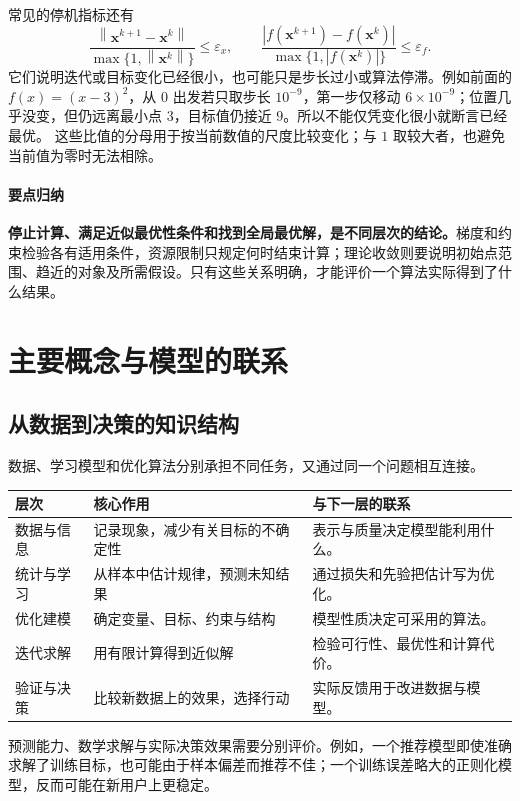 \documentclass[UTF8,fontset=fandol,a4paper,12pt]{ctexart}
\newcommand{\vx}{\boldsymbol x}
\newcommand{\norm}[1]{\left\lVert#1\right\rVert}
\theoremstyle{definition}
\begin{document}
常见的停机指标还有
\[
 \frac{\norm{\vx^{k+1}-\vx^k}}{\max\{1,\norm{\vx^k}\}}\le\varepsilon_x,
 \qquad
 \frac{|f(\vx^{k+1})-f(\vx^k)|}{\max\{1,|f(\vx^k)|\}}\le\varepsilon_f.
\]
它们说明迭代或目标变化已经很小，也可能只是步长过小或算法停滞。例如前面的 $f(x)=(x-3)^2$，从 $0$ 出发若只取步长 $10^{-9}$，第一步仅移动 $6\times10^{-9}$；位置几乎没变，但仍远离最小点 $3$，目标值仍接近 $9$。所以不能仅凭变化很小就断言已经最优。
这些比值的分母用于按当前数值的尺度比较变化；与 $1$ 取较大者，也避免当前值为零时无法相除。

\paragraph{要点归纳}
\textbf{停止计算、满足近似最优性条件和找到全局最优解，是不同层次的结论。}梯度和约束检验各有适用条件，资源限制只规定何时结束计算；理论收敛则要说明初始点范围、趋近的对象及所需假设。只有这些关系明确，才能评价一个算法实际得到了什么结果。

\section{主要概念与模型的联系}
\subsection{从数据到决策的知识结构}
数据、学习模型和优化算法分别承担不同任务，又通过同一个问题相互连接。
\begin{center}
\begin{tabular}{p{}p{}p{}}
\toprule
层次 & 核心作用 & 与下一层的联系\\
\midrule
数据与信息 & 记录现象，减少有关目标的不确定性 & 表示与质量决定模型能利用什么。\\
统计与学习 & 从样本中估计规律，预测未知结果 & 通过损失和先验把估计写为优化。\\
优化建模 & 确定变量、目标、约束与结构 & 模型性质决定可采用的算法。\\
迭代求解 & 用有限计算得到近似解 & 检验可行性、最优性和计算代价。\\
验证与决策 & 比较新数据上的效果，选择行动 & 实际反馈用于改进数据与模型。\\
\bottomrule
\end{tabular}
\end{center}
预测能力、数学求解与实际决策效果需要分别评价。例如，一个推荐模型即使准确求解了训练目标，也可能由于样本偏差而推荐不佳；一个训练误差略大的正则化模型，反而可能在新用户上更稳定。
\end{document}
